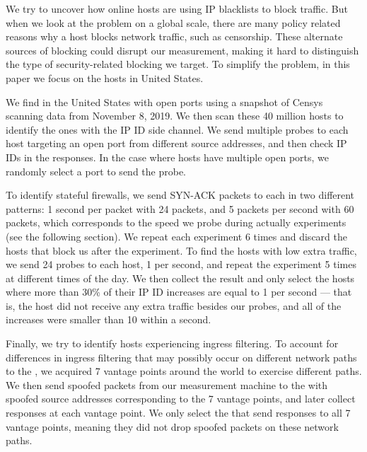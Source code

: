 We try to uncover how online hosts are using IP blacklists to
block traffic. But when we look at the problem on a global scale, there are
many policy related reasons why a host blocks network traffic,
such as censorship. These alternate sources of blocking could disrupt our
measurement, making it hard to distinguish the type of security-related blocking we target.
To simplify the problem, in this paper we focus on the hosts in
United States.


We find {} in the United States with open ports using a snapshot
of Censys~\cite{censys} scanning data from November 8, 2019. We
then scan these 40 million hosts to identify the ones with the IP ID side channel. We send multiple probes to each host targeting an open port from different
source addresses, and then check IP IDs in the responses. In the case where hosts have
multiple open ports, we randomly select a port to send the probe.

To identify stateful firewalls, we send SYN-ACK packets to each {}
in two different patterns: 1 second per packet with 24 packets, and 5 packets
per second with 60 packets, which corresponds to the speed we probe
{} during actually experiments (see the following section). We
repeat each experiment 6 times and discard the hosts that block us after the
experiment. To find the hosts with low extra traffic, we send 24 probes
to each host, 1 per second, and repeat the experiment 5 times at different
times of the day. We then collect the result and only select the hosts where
more than 30\% of their IP ID increases are equal to 1 per second --- that is,
the host did not receive any extra traffic besides our probes,
and all of the increases were smaller than 10 within a second.

Finally, we try to identify hosts experiencing ingress filtering. To
account for differences in ingress filtering that may possibly occur on
different network paths to the {}, we acquired 7 vantage points around
the world to exercise different paths. %
We then send spoofed packets from our measurement
machine to the {} with spoofed source addresses corresponding to
the 7 vantage points, and later collect responses at each vantage point.
We only select the {} that send responses to all 7
vantage points, meaning they did not drop spoofed packets on these network paths.

